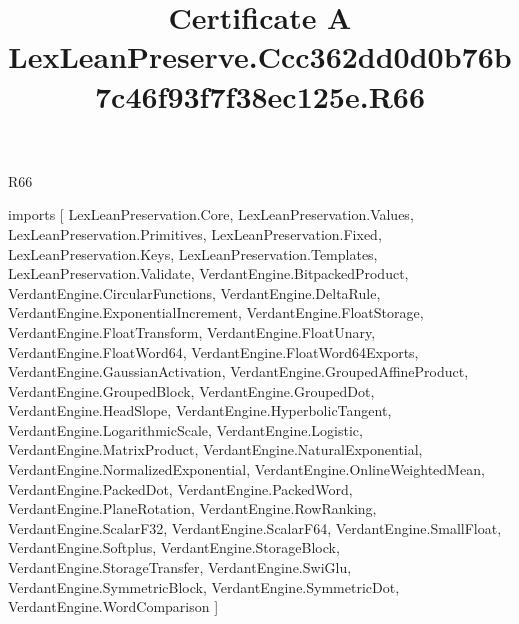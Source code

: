 \begin{lexlean}{R66}
\title{Certificate A LexLeanPreserve.Ccc362dd0d0b76b7c46f93f7f38ec125e.R66}
\begin{coremodule}
imports [
  LexLeanPreservation.Core,
  LexLeanPreservation.Values,
  LexLeanPreservation.Primitives,
  LexLeanPreservation.Fixed,
  LexLeanPreservation.Keys,
  LexLeanPreservation.Templates,
  LexLeanPreservation.Validate,
  VerdantEngine.BitpackedProduct,
  VerdantEngine.CircularFunctions,
  VerdantEngine.DeltaRule,
  VerdantEngine.ExponentialIncrement,
  VerdantEngine.FloatStorage,
  VerdantEngine.FloatTransform,
  VerdantEngine.FloatUnary,
  VerdantEngine.FloatWord64,
  VerdantEngine.FloatWord64Exports,
  VerdantEngine.GaussianActivation,
  VerdantEngine.GroupedAffineProduct,
  VerdantEngine.GroupedBlock,
  VerdantEngine.GroupedDot,
  VerdantEngine.HeadSlope,
  VerdantEngine.HyperbolicTangent,
  VerdantEngine.LogarithmicScale,
  VerdantEngine.Logistic,
  VerdantEngine.MatrixProduct,
  VerdantEngine.NaturalExponential,
  VerdantEngine.NormalizedExponential,
  VerdantEngine.OnlineWeightedMean,
  VerdantEngine.PackedDot,
  VerdantEngine.PackedWord,
  VerdantEngine.PlaneRotation,
  VerdantEngine.RowRanking,
  VerdantEngine.ScalarF32,
  VerdantEngine.ScalarF64,
  VerdantEngine.SmallFloat,
  VerdantEngine.Softplus,
  VerdantEngine.StorageBlock,
  VerdantEngine.StorageTransfer,
  VerdantEngine.SwiGlu,
  VerdantEngine.SymmetricBlock,
  VerdantEngine.SymmetricDot,
  VerdantEngine.WordComparison
]


\end{coremodule}
\end{lexlean}
